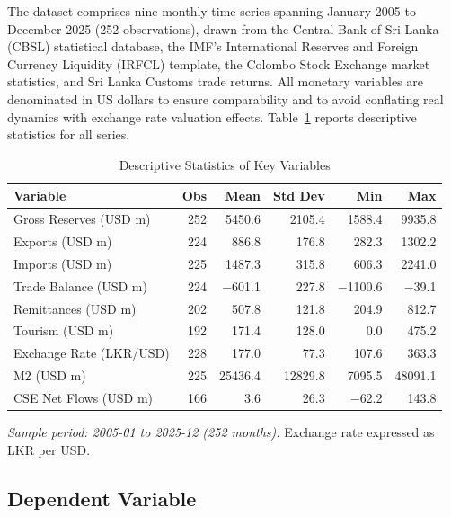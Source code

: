 \documentclass[12pt,a4paper]{article}
\begin{document}
The dataset comprises nine monthly time series spanning January 2005 to December 2025 (252 observations), drawn from the Central Bank of Sri Lanka (CBSL) statistical database, the IMF's International Reserves and Foreign Currency Liquidity (IRFCL) template, the Colombo Stock Exchange market statistics, and Sri Lanka Customs trade returns. All monetary variables are denominated in US dollars to ensure comparability and to avoid conflating real dynamics with exchange rate valuation effects. Table~\ref{tab:descriptive} reports descriptive statistics for all series.

\begin{table}[htbp]
\centering
\caption{Descriptive Statistics of Key Variables}
\label{tab:descriptive}
\begin{tabular}{lrrrrr}
\toprule
Variable & Obs & Mean & Std Dev & Min & Max \\
\midrule
Gross Reserves (USD m) & 252 & 5450.6 & 2105.4 & 1588.4 & 9935.8 \\
Exports (USD m) & 224 & 886.8 & 176.8 & 282.3 & 1302.2 \\
Imports (USD m) & 225 & 1487.3 & 315.8 & 606.3 & 2241.0 \\
Trade Balance (USD m) & 224 & $-$601.1 & 227.8 & $-$1100.6 & $-$39.1 \\
Remittances (USD m) & 202 & 507.8 & 121.8 & 204.9 & 812.7 \\
Tourism (USD m) & 192 & 171.4 & 128.0 & 0.0 & 475.2 \\
Exchange Rate (LKR/USD) & 228 & 177.0 & 77.3 & 107.6 & 363.3 \\
M2 (USD m) & 225 & 25436.4 & 12829.8 & 7095.5 & 48091.1 \\
CSE Net Flows (USD m) & 166 & 3.6 & 26.3 & $-$62.2 & 143.8 \\
\bottomrule
\end{tabular}
\begin{tablenotes}
\small
\item \textit{Sample period: 2005-01 to 2025-12 (252 months).} Exchange rate expressed as LKR per USD.
\end{tablenotes}
\end{table}

\subsection{Dependent Variable}
\end{document}
